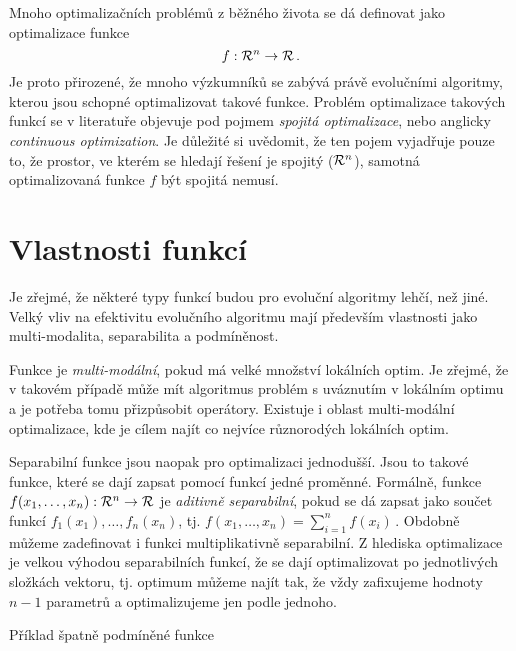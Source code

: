 
Mnoho optimalizačních problémů z běžného života se dá definovat jako optimalizace funkce $$f: {\mathcal{R}}^n \to {\ensuremath{\mathcal{R}}}\,.$$ Je proto přirozené, že mnoho výzkumníků se zabývá právě evolučními algoritmy, kterou jsou schopné optimalizovat takové funkce. Problém optimalizace takových funkcí se v literatuře objevuje pod pojmem \emph{spojitá optimalizace}, nebo anglicky \emph{continuous optimization}. Je důležité si uvědomit, že ten pojem vyjadřuje pouze to, že prostor, ve kterém se hledají řešení je spojitý (${\mathcal{R}}^n$), samotná optimalizovaná funkce $f$ být spojitá nemusí.

\section{Vlastnosti funkcí}

Je zřejmé, že některé typy funkcí budou pro evoluční algoritmy lehčí, než jiné. Velký vliv na efektivitu evolučního algoritmu mají především vlastnosti jako multi-modalita, separabilita a podmíněnost. 

Funkce je \emph{multi-modální}, pokud má velké množství lokálních optim. Je zřejmé, že v takovém případě může mít algoritmus problém s uváznutím v lokálním optimu a je potřeba tomu přizpůsobit operátory. Existuje i oblast multi-modální optimalizace, kde je cílem najít co nejvíce různorodých lokálních optim. 

Separabilní funkce jsou naopak pro optimalizaci jednodušší. Jsou to takové funkce, které se dají zapsat pomocí funkcí jedné proměnné. Formálně, funkce $f(x_1, \dots, x_n): {\mathcal{R}}^n \to {\ensuremath{\mathcal{R}}}$ je \emph{aditivně separabilní}, pokud se dá zapsat jako součet funkcí $f_1(x_1), \dots, f_n(x_n)$, tj. $f(x_1, \dots, x_n)= \sum_{i=1}^n f(x_i)\,.$ Obdobně můžeme zadefinovat i funkci multiplikativně separabilní. Z hlediska optimalizace je velkou výhodou separabilních funkcí, že se dají optimalizovat po jednotlivých složkách vektoru, tj. optimum můžeme najít tak, že vždy zafixujeme hodnoty $n-1$ parametrů a optimalizujeme jen podle jednoho.


\begin{marginfigure}
\centering
{}
\caption{Příklad špatně podmíněné funkce}
\end{marginfigure}